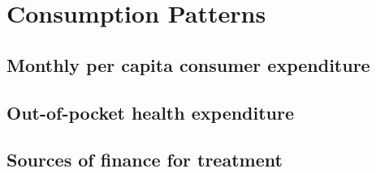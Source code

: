 \section{Consumption Patterns}
\lipsum[40]
\subsection{Monthly per capita consumer expenditure}
\subsection{Out-of-pocket health expenditure}
\subsection{Sources of finance for treatment}